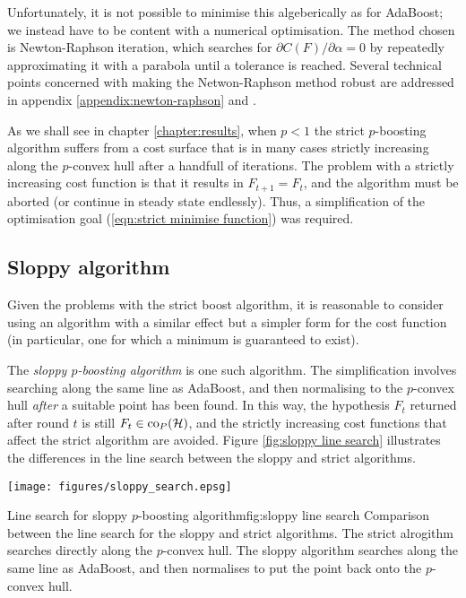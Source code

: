 Unfortunately, it is not possible to minimise this algeberically as
for AdaBoost; we instead have to be content with a numerical
optimisation.  The method chosen is Newton-Raphson iteration, which
searches for $\partial C(F) / \partial \alpha = 0$ by repeatedly
approximating it with a parabola until a tolerance is reached.
Several technical points concerned with making the Netwon-Raphson
method robust are addressed in appendix \ref{appendix:newton-raphson}
and \cite{Heath97}.

As we shall see in chapter \ref{chapter:results}, when $p < 1$ the
strict $p$-boosting algorithm suffers from a cost surface that is in
many cases strictly increasing along the $p$-convex hull after a
handfull of iterations.  The problem with a strictly increasing cost
function is that it results in $F_{t+1} = F_t$, and the algorithm must
be aborted (or continue in steady state endlessly).  Thus, a
simplification of the optimisation goal (\ref{eqn:strict minimise
function}) was required.


\subsection{Sloppy algorithm}

Given the problems with the strict boost algorithm, it is reasonable
to consider using an algorithm with a similar effect but a simpler
form for the cost function (in particular, one for which a minimum is
guaranteed to exist).

The \emph{sloppy $p$-boosting algorithm} is one such algorithm.  The
simplification involves searching along the same line as AdaBoost, and
then normalising to the $p$-convex hull \emph{after} a suitable point
has been found.  In this way, the hypothesis $F_t$ returned after
round $t$ is still $F_t \in \mathrm{co}_P(\mathcal{H})$, and the strictly increasing
cost functions that affect the strict algorithm are avoided.  Figure
\ref{fig:sloppy line search} illustrates the differences in the line
search between the sloppy and strict algorithms.

\begin{linefigure}
\begin{center}
\texttt{[image: figures/sloppy\_search.epsg]}
\end{center}
\begin{capt}{Line search for sloppy $p$-boosting algorithm}{fig:sloppy line search}
Comparison between the line search for the sloppy and strict
algorithms.  The strict alrogithm searches directly along the
$p$-convex hull.  The sloppy algorithm searches along the same line as
AdaBoost, and then normalises to put the point back onto the
$p$-convex hull.
\end{capt}
\end{linefigure}

